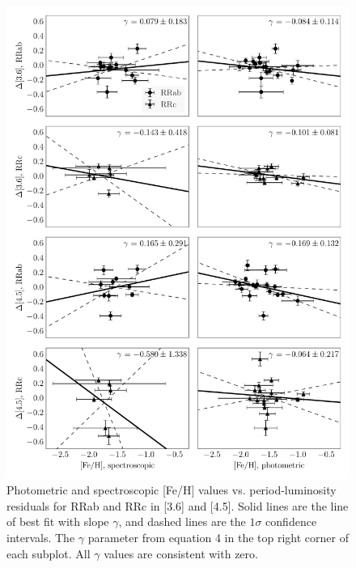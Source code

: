 \documentclass[a4paper,fleqn,usenatbib]{mnras}
\begin{document}
\begin{figure}
\begin{center}
\includegraphics[width=160mm]{reworked_fitting_code/final_plots/metallicity_vs_residuals_m4_split.pdf}
\caption{Photometric \citep{2000AJ....119.1824R} and spectroscopic \citep{2006ApJ...640L..43S} [Fe/H] values vs. period-luminosity residuals for RRab and RRc in [3.6] and [4.5]. Solid lines are the line of best fit with slope $\gamma$, and dashed lines are the $1\sigma$ confidence intervals. The $\gamma$ parameter from equation 4 in the top right corner of each subplot. All $\gamma$ values are consistent with zero.}
\label{fig:metallicity_residuals}
\end{center}
\end{figure}


\end{document}
